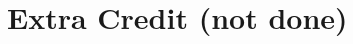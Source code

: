 \documentclass{article}
\newtheorem{question}{Question}
\begin{document}
\section{Extra Credit (not done)}

\end{document}
